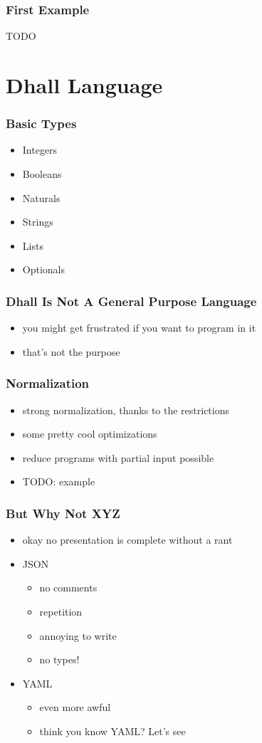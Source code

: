 \documentclass{beamer}
\begin{document}
 \begin{frame}
   \frametitle{First Example}
   TODO
 \end{frame}

 \section{Dhall Language}

 \begin{frame}
   \frametitle{Basic Types}
   \begin{itemize}
   \item Integers
   \item Booleans
   \item Naturals
   \item Strings
   \item Lists
   \item Optionals
   \end{itemize}
 \end{frame}

 \begin{frame}
   \frametitle{Dhall Is Not A General Purpose Language}
   \begin{itemize}
   \item you might get frustrated if you want to program in it
   \item that's not the purpose
   \end{itemize}
 \end{frame}

 \begin{frame}
   \frametitle{Normalization}
   \begin{itemize}
   \item strong normalization, thanks to the restrictions
   \item some pretty cool optimizations
   \item reduce programs with partial input possible
   \item TODO: example
   \end{itemize}
 \end{frame}

 \begin{frame}
   \frametitle{But Why Not XYZ}
   \begin{itemize}
   \item okay no presentation is complete without a rant
   \item JSON
     \begin{itemize}
     \item no comments
     \item repetition
     \item annoying to write
     \item no types!
     \end{itemize}
   \item YAML
     \begin{itemize}
     \item even more awful
     \item think you know YAML? Let's see
     \end{itemize}
   \end{itemize}
 \end{frame}
\end{document}
